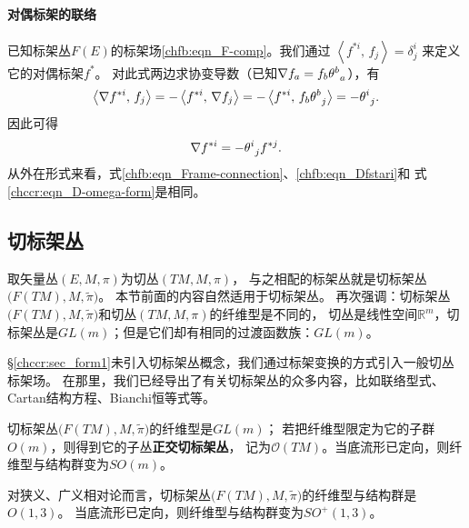 \paragraph{对偶标架的联络}
已知标架丛$F(E)$的标架场\eqref{chfb:eqn_F-comp}。我们通过
$\left< f^{*i} ,\, f_j\right> =\delta^i_j$
来定义它的对偶标架$f^{*}$。
对此式两边求协变导数（已知$\nabla f_a  =f_b \theta_{\hphantom{a}a}^{b}$），有
\begin{equation}
    \left< \nabla f^{*i} ,\, f_j\right> = - \left< f^{*i} ,\, \nabla f_j\right>
    =- \left< f^{*i} ,\, f_b \theta_{\hphantom{a}j}^{b} \right>
    =- \theta_{\hphantom{j}j}^{i}.
\end{equation} 
因此可得
\begin{equation}\label{chfb:eqn_Dfstari}
    \nabla f^{*i}=- \theta_{\hphantom{j}j}^{i} f^{*j} .
\end{equation}
从外在形式来看，式\eqref{chfb:eqn_Frame-connection}、\eqref{chfb:eqn_Dfstari}和
式\eqref{chccr:eqn_D-omega-form}是相同。








\subsection{切标架丛}\label{chfb:sec_tangent-frame-bundles}

取矢量丛$(E,M,\pi)$为切丛$(TM,M,\pi)$，
与之相配的标架丛就是切标架丛$\bigl(F(TM),M,\tilde{\pi}\bigr)$。
本节前面的内容自然适用于切标架丛。
再次强调：切标架丛$\bigl(F(TM),M,\tilde{\pi}\bigr)$和切丛$(TM,M,\pi)$的纤维型是不同的，
切丛是线性空间$\mathbb{R}^m$，切标架丛是$GL(m)$；但是它们却有相同的过渡函数族：$GL(m)$。



\S\ref{chccr:sec_form1}未引入切标架丛概念，我们通过标架变换的方式引入一般切丛标架场。
在那里，我们已经导出了有关切标架丛的众多内容，比如联络型式、Cartan结构方程、Bianchi恒等式等。

切标架丛$\bigl(F(TM),M,\tilde{\pi}\bigr)$的纤维型是$GL(m)$；
若把纤维型限定为它的子群$O(m)$，则得到它的子丛\textbf{正交切标架丛}，
记为$\mathcal{O}(TM)$。当底流形已定向，则纤维型与结构群变为$SO(m)$。

对狭义、广义相对论而言，切标架丛$\bigl(F(TM),M,\tilde{\pi}\bigr)$的纤维型与结构群是$O(1,3)$。
当底流形已定向，则纤维型与结构群变为$SO^{+}(1,3)$。



